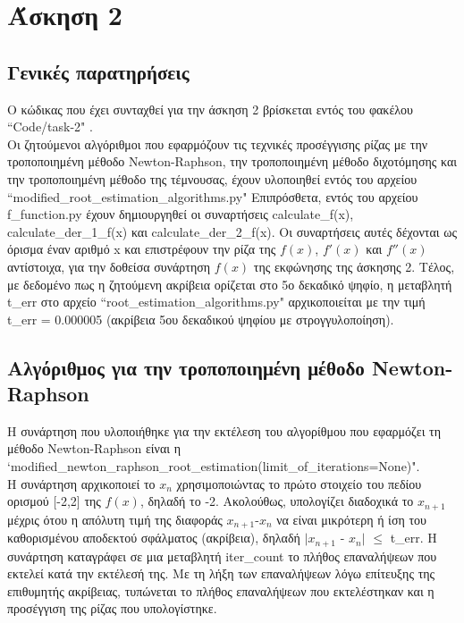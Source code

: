 \documentclass[a4paper,11pt]{article}
\newcommand{\lt}{\latintext}
\begin{document}
\section*{Άσκηση 2}
\subsection*{Γενικές παρατηρήσεις}
Ο κώδικας που έχει συνταχθεί για την άσκηση 2 βρίσκεται εντός του φακέλου {\lt ``Code/task-2" }.\\
Οι ζητούμενοι αλγόριθμοι που εφαρμόζουν τις τεχνικές προσέγγισης ρίζας με την τροποποιημένη μέθοδο {\lt Newton-Raphson}, την τροποποιημένη μέθοδο διχοτόμησης και την τροποποιημένη μέθοδο της τέμνουσας, έχουν 		υλοποιηθεί εντός του αρχείου {\lt ``modified\_root\_estimation\_algorithms.py"}
Επιπρόσθετα, εντός του αρχείου {\lt f\_function.py} έχουν δημιουργηθεί οι συναρτήσεις {\lt calculate\_f(x)}, {\lt calculate\_der\_1\_f(x)} και {\lt calculate\_der\_2\_f(x)}. Οι συναρτήσεις αυτές δέχονται ως όρισμα έναν
αριθμό x και επιστρέφουν την ρίζα της {\lt $f(x)$}, {\lt $f'(x)$} και {\lt $f''(x)$} αντίστοιχα, για την δοθείσα συνάρτηση {\lt $f(x)$} της εκφώνησης της άσκησης 2.
Τέλος, με δεδομένο πως η ζητούμενη ακρίβεια ορίζεται στο 5ο δεκαδικό ψηφίο, η μεταβλητή {\lt t\_err}  στο αρχείο {\lt ``root\_estimation\_algorithms.py"} αρχικοποιείται με την τιμή {\lt t\_err} = 0.000005 (ακρίβεια 5ου 			δεκαδικού ψηφίου με στρογγυλοποίηση).
\subsection*{Αλγόριθμος για την τροποποιημένη μέθοδο {\lt Newton-Raphson }}
Η συνάρτηση που υλοποιήθηκε για την εκτέλεση του αλγορίθμου που εφαρμόζει τη μέθοδο {\lt Newton-Raphson } είναι η {\lt `modified\_newton\_raphson\_root\_estimation(limit\_of\_iterations=None)"}.\\

Η συνάρτηση αρχικοποιεί το {$x_{n}$} χρησιμοποιώντας το πρώτο στοιχείο του πεδίου ορισμού [-2,2] της {\lt $f(x)$}, δηλαδή το -2. Ακολούθως, υπολογίζει διαδοχικά το  {$x_{n+1}$} μέχρις ότου
η απόλυτη τιμή της διαφοράς {$x_{n+1}$}-{$x_{n}$} να είναι μικρότερη ή ίση του καθορισμένου αποδεκτού σφάλματος (ακρίβεια), δηλαδή $|${$x_{n+1}$} - {$x_{n}$}$|$ {$\leq$} {\lt t\_err}. Η συνάρτηση καταγράφει σε 				μια μεταβλητή {\lt iter\_count} το πλήθος επαναλήψεων που εκτελεί κατά την εκτέλεσή της. Με τη λήξη των επαναλήψεων λόγω επίτευξης της επιθυμητής ακρίβειας, τυπώνεται το πλήθος επαναλήψεων που 						εκτελέστηκαν και η προσέγγιση της ρίζας που υπολογίστηκε.
\end{document}
